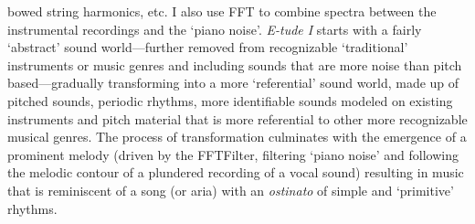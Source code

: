 bowed string harmonics, etc. I also use FFT to combine spectra between the instrumental recordings and the `piano noise'. \emph{E-tude I} starts with a fairly `abstract' sound world---further removed from recognizable `traditional' instruments or music genres and including sounds that are more noise than pitch based---gradually transforming into a more `referential' sound world, made up of pitched sounds, periodic rhythms, more identifiable sounds modeled on existing instruments and pitch material that is more referential to other more recognizable musical genres. The process of transformation culminates with the emergence of a prominent melody (driven by the FFTFilter, filtering `piano noise' and following the melodic contour of a plundered recording of a vocal sound) resulting in music that is reminiscent of a song (or aria) with an \emph{ostinato} of simple and `primitive' rhythms.

